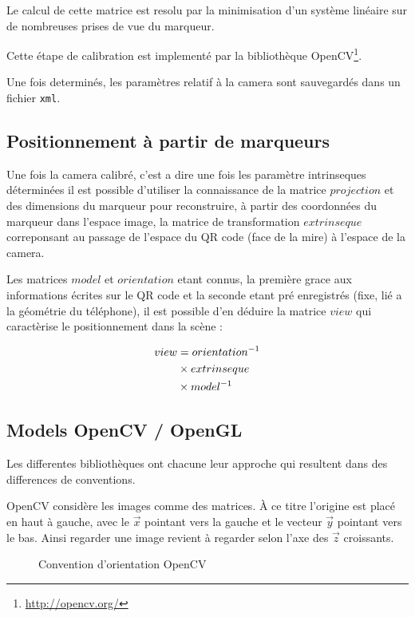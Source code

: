 \documentclass[10pt,a4paper,twoside, twocolumn]{report}
\newcommand*{\rootPath}{../}
\begin{document}
Le calcul de cette matrice est resolu par la minimisation d'un système linéaire sur de nombreuses prises de vue du marqueur. 

Cette étape de calibration est implementé par la bibliothèque OpenCV\footnote{\url{http://opencv.org/}}.

Une fois determinés, les paramètres relatif à la camera sont sauvegardés dans un fichier \texttt{xml}.

\subsection{Positionnement à partir de marqueurs}

Une fois la camera calibré, c'est a dire une fois les paramètre intrinseques déterminées il est possible d'utiliser la connaissance de la matrice $projection$ et des dimensions du marqueur pour reconstruire, à partir des coordonnées du marqueur dans l'espace image, la matrice de transformation $extrinseque$ correponsant au passage de l'espace du QR code (face de la mire) à l'espace de la camera.

Les matrices $model$ et $orientation$ etant connus, la première grace aux informations écrites sur le QR code et la seconde etant pré enregistrés (fixe, lié a la géométrie du téléphone), il est possible d'en déduire la matrice $view$ qui caractèrise le positionnement dans la scène :

\begin{align}
	view	&=			orientation^{-1}	\notag \\
				&\times extrinseque				\notag \\
				&\times model^{-1}
\end{align}

\subsection{Models OpenCV / OpenGL}

Les differentes bibliothèques ont chacune leur approche qui resultent dans des differences de conventions.

OpenCV considère les images comme des matrices. À ce titre l'origine est placé en haut à gauche, avec le $\vec x$ pointant vers la gauche et le vecteur $\vec y$ pointant vers le bas. Ainsi regarder une image revient à regarder selon l'axe des $\vec z$ croissants.

\begin{figure}[!ht]
	\centering
	
	\caption{Convention d'orientation OpenCV}
	\label{fig:tikz:space-opencv}
\end{figure}
\end{document}
